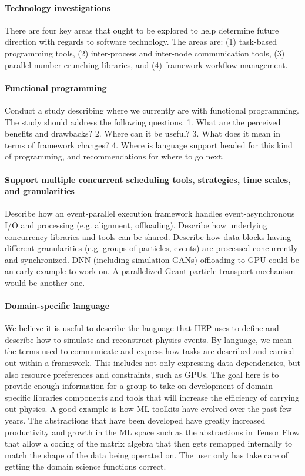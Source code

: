 \documentclass[12pt,a4paper]{article}
\begin{document}
\paragraph{Technology investigations} There are four key areas that
ought to be explored to help determine future direction with regards
to software technology. The areas are: (1) task-based programming tools,
(2) inter-process and inter-node communication tools, (3) parallel number
crunching libraries, and (4) framework workflow management.

\paragraph{Functional programming} Conduct a study describing where we
currently are with functional programming. The study should address
the following questions. 1. What are the perceived benefits and
drawbacks?  2. Where can it be useful? 3. What does it mean in terms
of framework changes? 4. Where is language support headed for this
kind of programming, and recommendations for where to go next.

\paragraph{Support multiple concurrent scheduling tools, strategies,
  time scales, and granularities} Describe how an event-parallel
execution framework handles event-asynchronous I/O and processing
(e.g. alignment, offloading). Describe how underlying concurrency
libraries and tools can be shared. Describe how data blocks having
different granularities (e.g.  groups of particles, events) are
processed concurrently and synchronized. DNN (including simulation
GANs) offloading to GPU could be an early example to work on. A
parallelized Geant particle transport mechanism would be another one.

\paragraph{Domain-specific language} We believe it is useful to
describe the language that HEP uses to define and describe how to
simulate and reconstruct physics events. By language, we mean the
terms used to communicate and express how tasks are described and
carried out within a framework. This includes not only expressing data
dependencies, but also resource preferences and constraints, such as
GPUs. The goal here is to provide enough information for a group to
take on development of domain-specific libraries components and tools
that will increase the efficiency of carrying out physics. A good example
is how ML toolkits have evolved over the past few years. The
abstractions that have been developed have greatly increased productivity
and growth in the ML space such as the abstractions in Tensor Flow that
allow a coding of the matrix algebra that then gets remapped internally to
match the shape of the data being operated on.  The user only has take care
of getting the domain science functions correct.
\end{document}

